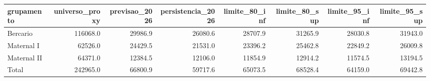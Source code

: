 \begin{tabular}{lrrrrrrr}
\toprule
grupamento & universo_proxy & previsao_2026 & persistencia_2026 & limite_80_inf & limite_80_sup & limite_95_inf & limite_95_sup \\
\midrule
Bercario & 116068.0 & 29986.9 & 26080.6 & 28707.9 & 31265.9 & 28030.8 & 31943.0 \\
Maternal I & 62526.0 & 24429.5 & 21531.0 & 23396.2 & 25462.8 & 22849.2 & 26009.8 \\
Maternal II & 64371.0 & 12384.5 & 12106.0 & 11854.9 & 12914.2 & 11574.5 & 13194.5 \\
Total & 242965.0 & 66800.9 & 59717.6 & 65073.5 & 68528.4 & 64159.0 & 69442.8 \\
\bottomrule
\end{tabular}

